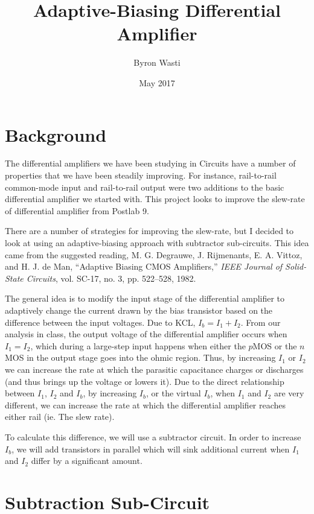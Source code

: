 \documentclass{article}
\title{Adaptive-Biasing Differential Amplifier}
\author{Byron Wasti}
\date{May 2017}
\begin{document}
\maketitle

\section{Background}

    The differential amplifiers we have been studying in Circuits have a number of properties that we have been steadily improving. For instance, rail-to-rail common-mode input and rail-to-rail output were two additions to the basic differential amplifier we started with. This project looks to improve the slew-rate of differential amplifier from Postlab 9.

    There are a number of strategies for improving the slew-rate, but I decided to look at using an adaptive-biasing approach with subtractor sub-circuits. This idea came from the suggested reading, M.  G.  Degrauwe,  J.  Rijmenants, E. A. Vittoz, and H. J. de Man, “Adaptive Biasing CMOS Amplifiers,” \textit{IEEE Journal of Solid-State Circuits}, vol. SC-17, no. 3, pp. 522–528, 1982.

    The general idea is to modify the input stage of the differential amplifier to adaptively change the current drawn by the bias transistor based on the difference between the input voltages. Due to KCL, $I_b = I_1 + I_2$. From our analysis in class, the output voltage of the differential amplifier occurs when $I_1 = I_2$, which during a large-step input happens when either the $p$MOS or the $n$MOS in the output stage goes into the ohmic region. Thus, by increasing $I_1$ or $I_2$ we can increase the rate at which the parasitic capacitance charges or discharges (and thus brings up the voltage or lowers it). Due to the direct relationship between $I_1$, $I_2$ and $I_b$, by increasing $I_b$, or the virtual $I_b$, when $I_1$ and $I_2$ are very different, we can increase the rate at which the differential amplifier reaches either rail (ie. The slew rate).

    To calculate this difference, we will use a subtractor circuit. In order to increase $I_b$, we will add transistors in parallel which will sink additional current when $I_1$ and $I_2$ differ by a significant amount.
    
\section{Subtraction Sub-Circuit}
\end{document}

